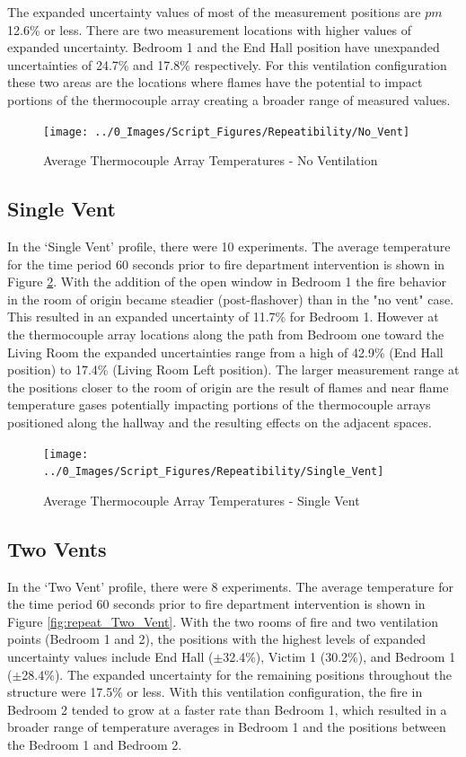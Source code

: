 \documentclass[12pt,oneside]{book}
\begin{document}
The expanded uncertainty values of most of the measurement positions are $pm$12.6\% or less.  There are two measurement locations with higher values of expanded uncertainty. Bedroom 1 and the End Hall position have unexpanded uncertainties of 24.7\% and 17.8\% respectively.  For this ventilation configuration these two areas are the locations where flames have the potential to impact portions of the thermocouple array creating a broader range of measured values.   

\begin{figure}[H]
\centering
\texttt{[image: ../0\_Images/Script\_Figures/Repeatibility/No\_Vent]}
\caption{Average Thermocouple Array Temperatures - No Ventilation}
\label{fig:repeat_No_Vent}
\end{figure}

\subsection{Single Vent}
In the `Single Vent' profile, there were 10 experiments. The average temperature for the time period 60 seconds prior to fire department intervention is shown in Figure \ref{fig:repeat_Single_Vent}.  With the addition of the open window in Bedroom 1 the fire behavior in the room of origin became steadier (post-flashover) than in the "no vent" case. This resulted in an expanded uncertainty of 11.7\% for Bedroom 1.  However at the thermocouple array locations along the path from Bedroom one toward the Living Room the expanded uncertainties range from a high of 42.9\% (End Hall position) to 17.4\% (Living Room Left position). The larger measurement range at the positions closer to the room of origin are the result of flames and near flame temperature gases potentially impacting portions of the thermocouple arrays positioned along the hallway and the resulting effects on the adjacent spaces.   


\begin{figure}[H]
\centering
\texttt{[image: ../0\_Images/Script\_Figures/Repeatibility/Single\_Vent]}
\caption{Average Thermocouple Array Temperatures - Single Vent}
\label{fig:repeat_Single_Vent}
\end{figure}

\subsection{Two Vents}
In the `Two Vent' profile, there were 8 experiments. The average temperature for the time period 60 seconds prior to fire department intervention is shown in Figure \ref{fig:repeat_Two_Vent}. With the two rooms of fire and two ventilation points (Bedroom 1 and 2), the positions with the highest levels of expanded uncertainty values include End Hall ($\pm$32.4\%), Victim 1 (30.2\%), and Bedroom 1 ($\pm$28.4\%). The expanded uncertainty for the remaining positions throughout the structure were 17.5\% or less.  With this ventilation configuration, the fire in Bedroom 2 tended to grow at a faster rate than Bedroom 1, which resulted in a broader range of temperature averages in Bedroom 1 and the positions between the Bedroom 1 and Bedroom 2.   
\end{document}
